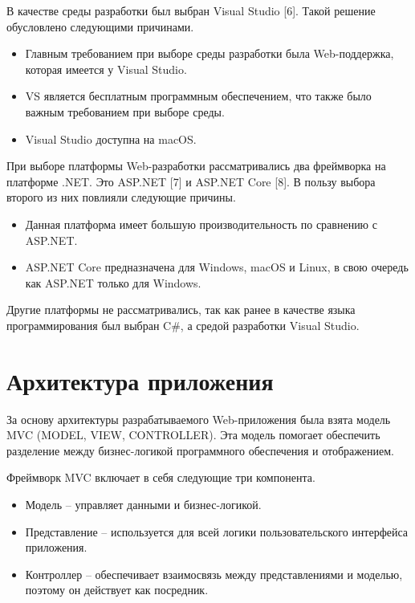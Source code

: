 \documentclass[a4paper,14pt, unknownkeysallowed]{extreport}
\begin{document}
В качестве среды разработки был выбран Visual Studio [6]. Такой решение обусловлено следующими причинами.

\begin{itemize}
	\item Главным требованием при выборе среды разработки была Web-поддержка, которая имеется у Visual Studio.
	\item VS является бесплатным программным обеспечением, что также было важным требованием при выборе среды.
	\item Visual Studio доступна на macOS.
\end{itemize}

При выборе платформы Web-разработки рассматривались два фреймворка на платформе .NET. Это ASP.NET [7] и ASP.NET Core [8]. В пользу выбора второго из них повлияли следующие причины.

\begin{itemize}
    \item Данная платформа имеет большую производительность по сравнению с ASP.NET.
    \item ASP.NET Core предназначена для Windows, macOS и Linux, в свою очередь как ASP.NET только для Windows.
\end{itemize}

Другие платформы не рассматривались, так как ранее в качестве языка программирования был выбран C\#, а средой разработки Visual Studio.

\section{Архитектура приложения}

За основу архитектуры разрабатываемого Web-приложения была взята модель MVC (MODEL, VIEW, CONTROLLER). Эта модель помогает обеспечить разделение между бизнес-логикой программного обеспечения и отображением. 

Фреймворк MVC включает в себя следующие три компонента.

\begin{itemize}
    \item Модель -- управляет данными и бизнес-логикой.
    \item Представление --  используется для всей логики пользовательского интерфейса приложения.
    \item Контроллер -- обеспечивает взаимосвязь между представлениями и моделью, поэтому он действует как посредник.
\end{itemize}
\end{document}
